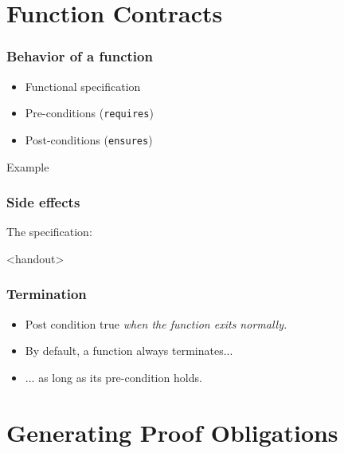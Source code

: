 \documentclass[pdf]{beamer}
\begin{document}
\section{Function Contracts}

\begin{frame}
  \frametitle{Behavior of a function}
  \begin{itemize}
  \item Functional specification
  \item<2->Pre-conditions (\texttt{requires})
  \item<3->Post-conditions (\texttt{ensures})
  \end{itemize}

  \begin{block}{Example}
    
  \end{block}
\end{frame}

\begin{frame}
  \frametitle{Side effects}
  \begin{block}{The specification:}%
  
  \end{block}
\end{frame}

 \begin{frame}<handout>
   \frametitle{Termination}
     \begin{itemize}
     \item<1> Post condition true \emph{when the function exits normally.}
     \item<3> By default, a function always terminates...
     \item<4> ... as long as its pre-condition holds.
     \end{itemize}
   
 \end{frame}

\section{Generating Proof Obligations}
\end{document}
